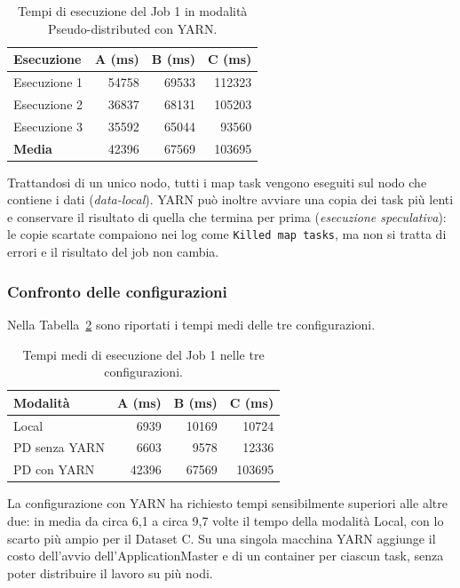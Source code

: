 \documentclass[12pt, a4paper]{article}
\begin{document}
\begin{table}[H]
\centering
\small
\begin{tabular}{|l|r|r|r|}
\hline
\textbf{Esecuzione} &
\textbf{A (ms)} &
\textbf{B (ms)} &
\textbf{C (ms)} \\
\hline
Esecuzione 1 & 54758 & 69533 & 112323 \\
Esecuzione 2 & 36837 & 68131 & 105203 \\
Esecuzione 3 & 35592 & 65044 & 93560 \\
\hline
\textbf{Media} & 42396 & 67569 & 103695 \\
\hline
\end{tabular}
\caption{Tempi di esecuzione del Job 1 in modalità Pseudo-distributed con YARN.}
\label{tab:job1yarn}
\end{table}

Trattandosi di un unico nodo, tutti i map task vengono
eseguiti sul nodo che contiene i dati (\textit{data-local}).
YARN può inoltre avviare una copia dei task più lenti
e conservare il risultato di quella che termina per prima
(\textit{esecuzione speculativa}): le copie scartate compaiono
nei log come \texttt{Killed map tasks}, ma non si tratta
di errori e il risultato del job non cambia.

\subsubsection{Confronto delle configurazioni}

Nella Tabella~\ref{tab:job1confronto} sono riportati
i tempi medi delle tre configurazioni.

\begin{table}[H]
\centering
\small
\begin{tabular}{|l|r|r|r|}
\hline
\textbf{Modalità} &
\textbf{A (ms)} &
\textbf{B (ms)} &
\textbf{C (ms)} \\
\hline
Local & 6939 & 10169 & 10724 \\
PD senza YARN & 6603 & 9578 & 12336 \\
PD con YARN & 42396 & 67569 & 103695 \\
\hline
\end{tabular}
\caption{Tempi medi di esecuzione del Job 1 nelle tre configurazioni.}
\label{tab:job1confronto}
\end{table}

La configurazione con YARN ha richiesto tempi
sensibilmente superiori alle altre due: in media da circa 6,1
a circa 9,7 volte il tempo della modalità Local,
con lo scarto più ampio per il Dataset C.
Su una singola macchina YARN aggiunge il costo
dell'avvio dell'ApplicationMaster e di un container
per ciascun task, senza poter distribuire il lavoro
su più nodi.
\end{document}
